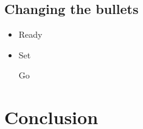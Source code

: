 \documentclass{article}
\begin{document}
\subsection{Changing the bullets}

\renewcommand{\labelitemi}{$\rightarrow$}
\begin{itemize}

 \item Ready
 
 \item Set
 
 \itemn Go
 
\end{itemize}

\section{Conclusion}
\end{document}
